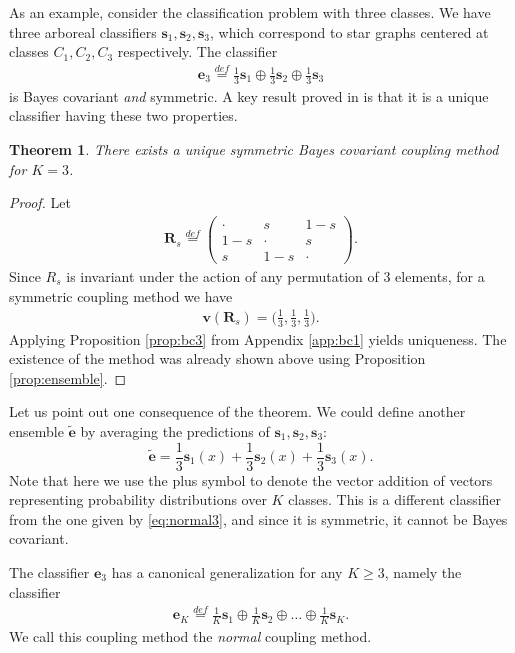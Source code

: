 \documentclass[pdflatex, sn-basic]{sn-jnl}%
\newtheorem{thm}{Theorem}
\theoremstyle{thmstyleone}%
\theoremstyle{thmstyletwo}%
\theoremstyle{thmstylethree}%
\begin{document}
As an example, consider the classification problem with three classes. We have three arboreal classifiers $\boldsymbol{s}_1, \boldsymbol{s}_2, \boldsymbol{s}_3$, which correspond to star graphs centered  at classes $C_1, C_2, C_3$ respectively. The classifier 
\begin{align}
\boldsymbol{e}_3 \stackrel{def}{=} \frac13 \boldsymbol{s}_1 \oplus \frac13 \boldsymbol{s}_2 \oplus \frac 13 \boldsymbol{s}_3  \label{eq:normal3}
\end{align}
is Bayes covariant \emph{and} symmetric. A key result proved in \cite{vsuch2016bayes} is that it is a unique  classifier having these two properties.

\begin{thm} \label{thm:K3}
	There exists a unique symmetric Bayes covariant coupling method for $K=3$.
\end{thm}

\begin{proof}
Let 
\begin{align}
	\boldsymbol{R}_s \stackrel{def}{=} \begin{pmatrix} \cdot & s & 1 -s \\  1-s & \cdot & s \\ s & 1-s & \cdot \end{pmatrix}.
\end{align}
Since $R_s$ is invariant under the action of any permutation of 3 elements, 
for a symmetric coupling method we have 
\begin{align}
	\boldsymbol{v} (\boldsymbol{R}_s) = \biggl(\frac 13, \frac 13, \frac 13 \biggr).
\end{align}
Applying  Proposition \ref{prop:bc3} from Appendix \ref{app:bc1} yields uniqueness. The existence of the method was already shown above using Proposition \ref{prop:ensemble}.
\end{proof}


Let us point out one consequence of the theorem. We could define another ensemble $\tilde{\boldsymbol{e}}$ by averaging the predictions of $\boldsymbol{s}_1, \boldsymbol{s}_2, \boldsymbol{s}_3$:
\[
\tilde{\boldsymbol{e}} = \frac13 \boldsymbol{s}_1(x) + \frac13 \boldsymbol{s}_2(x) + \frac 13 \boldsymbol{s}_3(x).
\]
Note that here we use the plus symbol to denote the vector addition of vectors representing  probability distributions over $K$ classes. This is a different classifier from the one given by  \eqref{eq:normal3}, and since it is symmetric, it cannot be Bayes covariant.

The classifier $\boldsymbol{e}_3$ has a canonical generalization for any $K\geq 3$, namely the classifier
\begin{align}
\boldsymbol{e}_K \stackrel{def}{=} \frac1K \boldsymbol{s}_1 \oplus \frac1K \boldsymbol{s}_2 \oplus \ldots \oplus \frac 1K \boldsymbol{s}_K.  \label{eq:bc1}
\end{align}
We call this coupling method the \emph{normal} coupling method.
\end{document}
